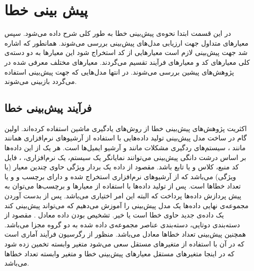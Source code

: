 \section{پیش بینی خطا}
\label{sec:bug-predict}
در این قسمت ابتدا نحوه‌ی پیش‌بینی خطا به طور کلی شرح داده می‌شود. سپس معیارهای متداول جهت ارزیابی مدل‌های پیش‌بینی بررسی می‌شوند. همانطور که اشاره شد جهت پیش‌بینی لازم است   معیارهایی از کد استخراج شود این معیارها به دو دسته‌ی کلی معیارهای کد و معیارهای فرآیند تقسیم می‌گردند. معیارهای مختلف معرفی شده در پژوهش‌های پیشین بررسی می‌شوند. در انتها   مدل‌هایی که جهت پیش‌بینی استفاده می‌گردد بازبینی می‌شوند. 

\subsection{فرآیند پیش‌بینی خطا}
\label{subsec:process}
اکثریت پژوهش‌های پیش‌بینی خطا از روش‌های یادگیری ماشین  استفاده کرده‌اند. اولین گام در ساخت مدل پیش‌بینی تولید داده‌هایی با استفاده از آرشیو‌های نرم‌افزاری همانند  مانند ، سیستم‌های ردگیری مشکلات  مانند  و آرشیو ایمیل‌ها است. هر یک از این داده‌ها بر اساس درشت دانگی پیش‌بینی می‌توانند نمایانگر یک سیستم، یک  نرم‌افزاری، ، فایل کد منبع، کلاس و یا تابع باشد. مقصود از داده یک بردار ویژگی حاوی چندین معیار (یا ویژگی) می‌باشد که از آرشیو‌های نرم‌افزاری استخراج شده و دارای برچسب  و    و یا تعداد خطاها است. پس از تولید داده‌ها با استفاده از معیارها و برچسب‌ها می‌توان به پیش پردازش داده‌ها پرداخت  که البته این امر اختیاری می‌باشد. پس از بدست آوردن مجموعه‌ی نهایی داده‌ها یک مدل پیش‌بینی را آموزش می‌دهیم که می‌تواند پیش‌بینی کند یک داده‌ی جدید حاوی خطا است یا خیر. تشخیص  بودن داده معادل . مقصود از دسته‌بندی دوتایی، دسته‌بندی عناصر مجموعه‌ی داده شده به دو گروه مجزا می‌باشد. همچنین پیش‌بینی تعداد خطاها معادل  می‌باشد.  منظور از رگرسیون فرآیند آماری است که در آن با استفاده از متغیرهای مستقل سعی می‌شود متغیر وابسته تخمین زده شود که در اینجا متغیرهای مستقل معیارهای پیش‌بینی خطا و متغیر وابسته تعداد خطاها می‌باشد. 

